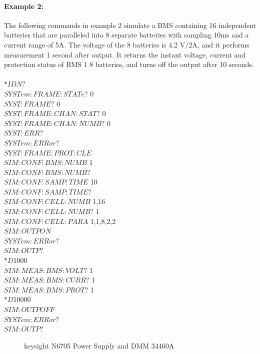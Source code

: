 \paragraph{Example 2:} The following commands in example 2 simulate a BMS containing 16 independent batteries that are paralleled into 8 separate batteries with sampling 10ms and a current range of 5A. The voltage of the 8 batteries is 4.2 V/2A, and it performs measurement 1 second after output. It returns the instant voltage, current and protection status of BMS 1 8 batteries, and turns off the output after 10 seconds.
\\\\
$*IDN?$ \\
$SYSTem:FRAME:STATe?$ 0\\
$SYST:FRAME?$ 0\\
$SYST:FRAME:CHAN:STAT?$ 0\\
$SYST:FRAME:CHAN:NUMB?$ 0 \\
$SYST:ERR?$\\
$SYSTem:ERRor?$\\ 
$SYST:FRAME:PROT:CLE$\\
$SIM:CONF:BMS:NUMB$ 1\\ 
$SIM:CONF:BMS:NUMB?$ \\
$SIM:CONF:SAMP:TIME$ 10\\ 
$SIM:CONF:SAMP:TIME?$\\ 
$SIM:CONF:CELL:NUMB$ 1,16\\
$SIM:CONF:CELL:NUMB?$ 1\\
$SIM:CONF:CELL:PARA$ 1,1,8,2,2\\
$SIM:OUTP ON$\\
$SYSTem:ERRor?$ \\
$SIM:OUTP?$\\
$*D $1000\\
$SIM:MEAS:BMS:VOLT?$ 1\\
$SIM:MEAS:BMS:CURR?$ 1\\
$SIM:MEAS:BMS:PROT?$ 1\\
$*D $10000\\
$SIM:OUTP OFF$\\
$SYSTem:ERRor?$\\
$SIM:OUTP?$\\


\begin{figure}[h]
	\centering
    \qquad
	\caption{ keysight N6705 Power Supply and DMM 34460A }
	\label{fig:keysight_n6705_DMM_34460A}
\end{figure}

